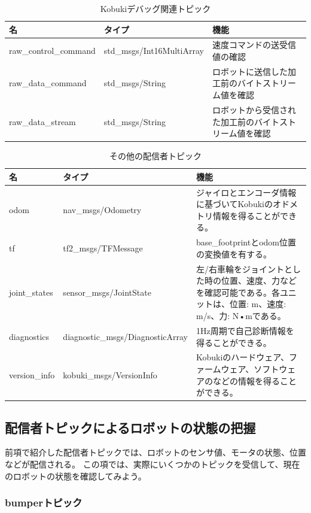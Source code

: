 \begin{itemize}
\begin{table}[h]
\centering
\begin{tabular}{l l l}
\toprule
\textbf{名} & \textbf{タイプ} & \textbf{機能}\\
\midrule
raw\_control\_command & std\_msgs/Int16MultiArray & 速度コマンドの送受信値の確認 \\
raw\_data\_command  & std\_msgs/String & ロボットに送信した加工前のバイトストリーム値を確認 \\
raw\_data\_stream & std\_msgs/String & ロボットから受信された加工前のバイトストリーム値を確認 \\
\bottomrule
\end{tabular}
\caption{Kobukiデバッグ関連トピック}
\end{table}

\begin{table}[h]
\centering
\begin{tabular}{l l l}
\toprule
\textbf{名} & \textbf{タイプ} & \textbf{機能}\\
\midrule
odom & nav\_msgs/Odometry & ジャイロとエンコーダ情報に基づいてKobukiのオドメトリ情報を得ることができる。\\
tf & tf2\_msgs/TFMessage & base\_footprintとodom位置の変換値を有する。\\
joint\_states & sensor\_msgs/JointState & 左/右車輪をジョイントとした時の位置、速度、力などを確認可能である。各ユニットは、位置: m、速度: m/s、力: N•mである。\\
diagnostics & diagnostic\_msgs/DiagnosticArray & 1Hz周期で自己診断情報を得ることができる。\\
version\_info & kobuki\_msgs/VersionInfo & Kobukiのハードウェア、ファームウェア、ソフトウェアのなどの情報を得ることができる。\\
\bottomrule
\end{tabular}
\caption{その他の配信者トピック}
\end{table}

\subsection{配信者トピックによるロボットの状態の把握}

前項で紹介した配信者トピックでは、ロボットのセンサ値、モータの状態、位置などが配信される。  この項では、実際にいくつかのトピックを受信して、現在のロボットの状態を確認してみよう。

\subsubsection{bumperトピック}


\end{itemize}
